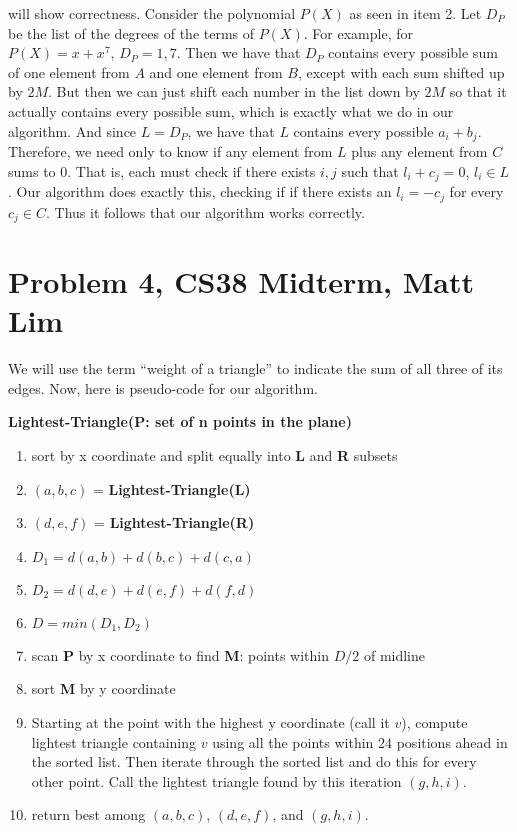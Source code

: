 \documentclass{article}
\begin{document}
\begin{description}
        will show correctness. Consider the polynomial $P(X)$ as seen in item 2.
        Let $D_P$ be the list of the degrees of the terms of $P(X)$. For
        example, for $P(X) = x + x^7$, $D_P = 1, 7$. Then we have that $D_P$
        contains every possible sum of one element from $A$ and one element from
        $B$, except with each sum shifted up by $2M$. But then we can just shift
        each number in the list down by $2M$ so that it actually contains every
        possible sum, which is exactly what we do in our algorithm.
        And since $L = D_P$, we have that $L$ contains every possible $a_i
        + b_j$. Therefore, we need only to know
        if any element from $L$ plus any element from $C$ sums to $0$. That is,
        each must check if there exists $i,j$ such that $l_i + c_j = 0$, $l_i
        \in L$. Our algorithm does exactly this, checking if if there exists an
        $l_i = -c_j$ for every $c_j \in C$. Thus it follows that our algorithm
        works correctly.

\end{description}
\newpage

\section*{Problem 4, CS38 Midterm, Matt Lim}
We will use the term ``weight of a triangle'' to indicate the sum of all three
of its edges. Now, here is pseudo-code for our algorithm.

\vspace{5mm}
\noindent \textbf{Lightest-Triangle(P: set of n points in the plane)}
\begin{enumerate}
    \item sort by x coordinate and split equally into \textbf{L} and \textbf{R} subsets
    \item $(a,b,c)$ = \textbf{Lightest-Triangle(L)}
    \item $(d,e,f)$ = \textbf{Lightest-Triangle(R)}
    \item $D_1 = d(a,b) + d(b,c) + d(c,a)$
    \item $D_2 = d(d,e) + d(e,f) + d(f,d)$
    \item $D = min(D_1, D_2)$
    \item scan \textbf{P} by x coordinate to find \textbf{M}: points within $D/2$ of midline
    \item sort \textbf{M} by y coordinate
    \item Starting at the point with the highest y coordinate (call it $v$),
        compute lightest triangle containing $v$ using all the points within
        $24$ positions ahead in the sorted list. Then iterate through the sorted
        list and do this for every other point. Call the lightest triangle found
        by this iteration $(g,h,i)$.
    \item return best among $(a,b,c)$, $(d,e,f)$, and $(g,h,i)$.
\end{enumerate}
\end{document}
